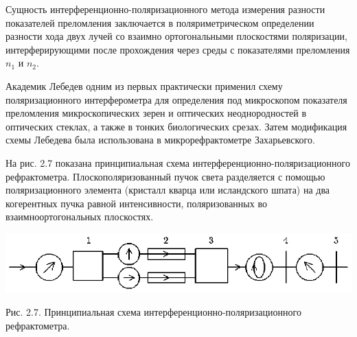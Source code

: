  \vskip 2mm Сущность
интерференционно-поляризационного метода измерения разности
показателей преломления заключается в поляриметрическом
определении разности хода двух лучей со взаимно ортогональными
плоскостями поляризации, интерферирующими после прохождения через
среды с показателями преломления $n_1$ и $n_2$.

Академик Лебедев одним из первых практически применил схему
поляризационного интерферометра для определения под микроскопом
показателя преломления микроскопических зерен и оптических
неоднородностей в оптических стеклах, а также в тонких
биологических срезах. Затем модификация схемы Лебедева была
использована в микрорефрактометре Захарьевского.

На рис. 2.7 показана принципиальная схема
интерференционно-поляризационного рефрактометра.
Плоскополяризованный пучок света разделяется с помощью
поляризационного элемента (кристалл кварца или исландского шпата)
на два когерентных пучка равной интенсивности, поляризованных во
взаимноортогональных плоскостях.

\vskip 3mm
\centerline{\hbox{\includegraphics[scale=0.7]{Ris/ris_eps/ris2_07.eps}}}

\leftskip 0cm\centerline{\ris Рис. 2.7. Принципиальная схема
интерференционно-поляризационного рефрактометра.}

